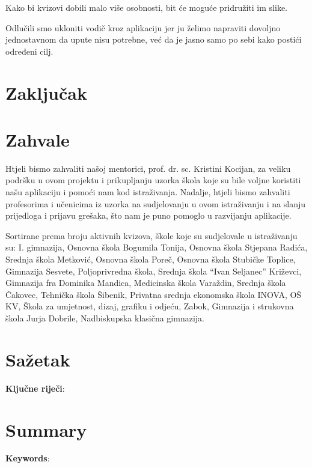 \documentclass{scrreprt}
\begin{document}
Kako bi kvizovi dobili malo više osobnosti, bit će moguće pridružiti im slike.

Odlučili smo ukloniti vodič kroz aplikaciju jer ju želimo napraviti dovoljno
jednostavnom da upute nisu potrebne, već da je jasno samo po sebi kako postići
određeni cilj.

\chapter{Zaključak}

\chapter{Zahvale}

Htjeli bismo zahvaliti našoj mentorici, prof. dr. sc. Kristini Kocijan, za
veliku podršku u ovom projektu i prikupljanju uzorka škola koje su bile voljne
koristiti našu aplikaciju i pomoći nam kod istraživanja. Nadalje, htjeli bismo
zahvaliti profesorima i učenicima iz uzorka na sudjelovanju u ovom istraživanju
i na slanju prijedloga i prijavu grešaka, što nam je puno pomoglo u razvijanju
aplikacije.

Sortirane prema broju aktivnih kvizova, škole koje su sudjelovale u istraživanju
su: I. gimnazija, Osnovna škola Bogumila Tonija, Osnovna škola Stjepana Radića,
Srednja škola Metković, Osnovna škola Poreč, Osnovna škola Stubičke Toplice,
Gimnazija Sesvete, Poljoprivredna škola, Srednja škola ``Ivan Seljanec''
Križevci, Gimnazija fra Dominika Mandica, Medicinska škola Varaždin, Srednja
škola Čakovec, Tehnička škola Šibenik, Privatna srednja ekonomska škola INOVA,
OŠ KV, Škola za umjetnost, dizaj, grafiku i odjeću, Zabok, Gimnazija i strukovna
škola Jurja Dobrile, Nadbiskupska klasična gimnazija.

\listoffigures

\renewcommand{\bibname}{Popis literature}

\begin{thebibliography}{9}
\end{thebibliography}

\chapter{Sažetak}

\textbf{Ključne riječi}:

\chapter{Summary}

\textbf{Keywords}:
\end{document}

